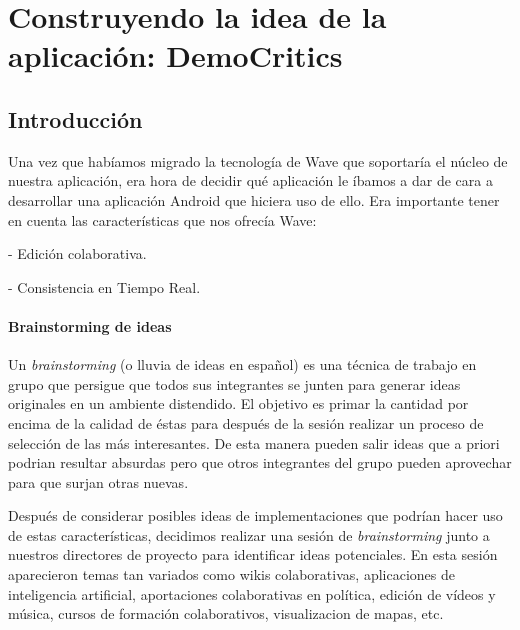 \newpage
\thispagestyle{sectioned}
\chapter{Construyendo la idea de la aplicación: DemoCritics}

\section{Introducción}

Una vez que habíamos migrado la tecnología de Wave que soportaría el núcleo de nuestra aplicación, era hora de decidir qué aplicación le íbamos a dar de cara a desarrollar una aplicación Android que hiciera uso de ello. Era importante tener en cuenta las características que nos ofrecía Wave:

 - Edición colaborativa.

 - Consistencia en Tiempo Real.
 
\subsubsection{Brainstorming de ideas}

Un \textit{brainstorming} \cite{ref:bookBrainStorming} (o lluvia de ideas en español) es una técnica de trabajo en grupo que persigue que todos sus integrantes se junten para generar ideas originales en un ambiente distendido. El objetivo es primar la cantidad por encima de la calidad de éstas para después de la sesión realizar un proceso de selección de las más interesantes. De esta manera pueden salir ideas que a priori podrian resultar absurdas pero que otros integrantes del grupo pueden aprovechar para que surjan otras nuevas.  

Después de considerar posibles ideas de implementaciones que podrían hacer uso de estas características, decidimos realizar una sesión de \textit{brainstorming} junto a nuestros directores de proyecto para identificar ideas potenciales. En esta sesión aparecieron temas tan variados como wikis colaborativas, aplicaciones de inteligencia artificial, aportaciones colaborativas en política, edición de vídeos y música, cursos de formación colaborativos, visualizacion de mapas, etc.

